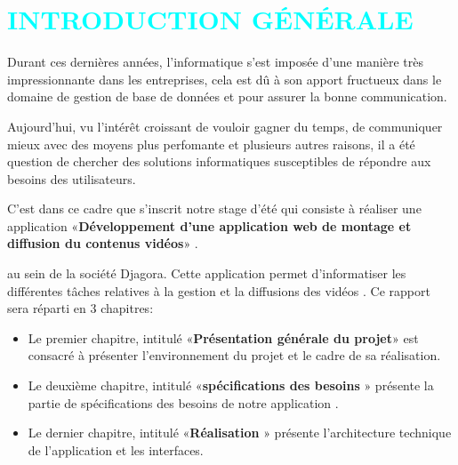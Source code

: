 \chapter*{\centering \textcolor{cyan}{INTRODUCTION GÉNÉRALE}}
\renewcommand{\labelitemi}{$\bullet$}
\adjustmtc
\thispagestyle{MyStyle}
Durant ces dernières années, l’informatique s’est imposée d’une manière très impressionnante dans les entreprises, cela est dû à son apport fructueux dans le domaine de gestion de base de données et pour assurer la bonne communication.\par

Aujourd’hui, vu l’intérêt croissant de vouloir gagner du temps, de communiquer mieux avec des moyens plus perfomante et plusieurs autres raisons, il a été question de chercher des solutions informatiques susceptibles de répondre aux besoins des utilisateurs.\par
C’est dans ce cadre que s’inscrit notre stage d’été qui consiste à réaliser une application «\textbf{Développement d’une application web de montage et diffusion du contenus vidéos}» .\par
au sein de la société Djagora. Cette application permet d’informatiser les différentes tâches relatives à la gestion et la diffusions des vidéos . Ce rapport sera réparti en 3 chapitres:\par 
\begin{itemize}
        \item Le premier chapitre, intitulé «\textbf{Présentation générale du projet}» est consacré à présenter l’environnement du projet et le cadre de sa réalisation.
    \item Le deuxième chapitre, intitulé «\textbf{spécifications des besoins} » présente la partie de spécifications des besoins de notre application .
    \item Le dernier chapitre, intitulé «\textbf{Réalisation} » présente l’architecture technique de l’application et les interfaces.
\end{itemize}
